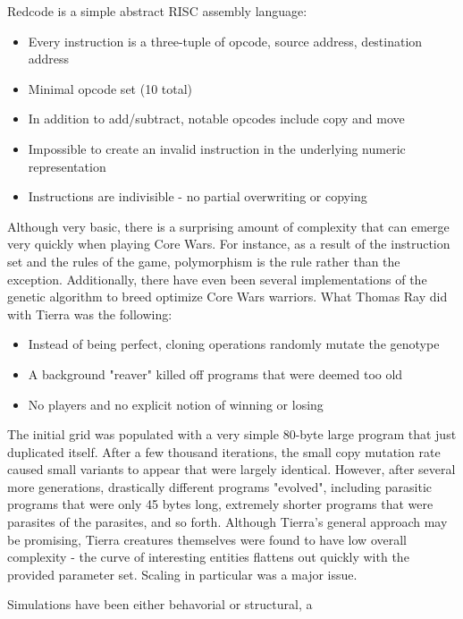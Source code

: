 \documentclass{article}
\begin{document}
Redcode is a simple abstract RISC assembly language:

\begin{itemize}
\item Every instruction is a three-tuple of opcode, source address, destination address
\item Minimal opcode set (10 total)
\item In addition to add/subtract, notable opcodes include copy and move
\item Impossible to create an invalid instruction in the underlying numeric representation
\item Instructions are indivisible - no partial overwriting or copying
\end{itemize}

	Although very basic, there is a surprising amount of complexity that can emerge very quickly when playing Core Wars. For instance, as a result of the instruction set and the rules of the game, polymorphism is the rule rather than the exception. Additionally, there have even been several implementations of the genetic algorithm to breed optimize Core Wars warriors. What Thomas Ray did with Tierra was the following: 

\begin{itemize}
\item Instead of being perfect, cloning operations randomly mutate the genotype
\item A background "reaver" killed off programs that were deemed too old
\item No players and no explicit notion of winning or losing
\end{itemize}

The initial grid was populated with a very simple 80-byte large program that just duplicated itself. After a few thousand iterations, the small copy mutation rate caused small variants to appear that were largely identical.
However, after several more generations, drastically different programs "evolved", including parasitic programs that were only 45 bytes long, extremely shorter programs that were parasites of the parasites, and so forth.
Although Tierra's general approach may be promising, Tierra creatures themselves were found to have low overall complexity - the curve of interesting entities flattens out quickly with the provided parameter set. Scaling in particular was a major issue.



Simulations have been either behavorial or structural, a
\end{document}

